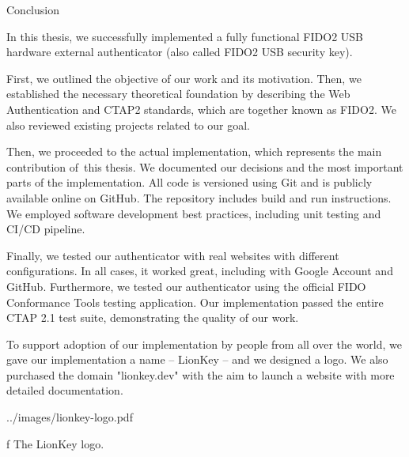 \chap[conclusion] Conclusion

In this thesis, {\sbf we successfully implemented} a fully functional FIDO2 USB hardware external authenticator (also called FIDO2 USB security key).

First, we outlined the objective of our work and its motivation. Then, we established the necessary theoretical foundation by describing the Web Authentication and CTAP2 standards, which are together known as FIDO2. We also reviewed existing projects related to our goal.

Then, we proceeded to the actual implementation, which represents the main contribution of~this thesis. We documented our decisions and the most important parts of the implementation. All code is versioned using Git and is publicly {\sbf available online on GitHub}. The repository includes build and run instructions. We employed software development best practices, including unit testing and CI/CD pipeline.

Finally, {\sbf we tested} our authenticator {\sbf with real websites} with different configurations. In all cases, {\sbf it worked great}, including with Google Account and GitHub.
Furthermore, we tested our authenticator using the official FIDO Conformance Tools testing application. Our implementation passed the entire CTAP 2.1 test suite, demonstrating the quality of our work.

To support adoption of our implementation by people from all over the world, we gave our implementation a name – LionKey – and we designed a logo. We also purchased the domain "lionkey.dev" with the aim to launch a website with more detailed documentation.

\midinsert
\picheight=45mm \cinspic ../images/lionkey-logo.pdf
\caption/f The LionKey logo.
\endinsert
